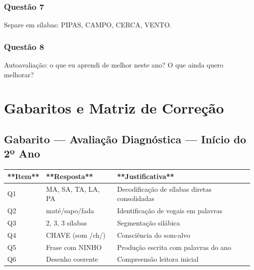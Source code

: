 \subsection*{Questão 7}
Separe em sílabas: PIPAS, CAMPO, CERCA, VENTO.

\begin{center}
  \underline{\hspace{12cm}}
\end{center}

\subsection*{Questão 8}
Autoavaliação: o que eu aprendi de melhor neste ano? O que ainda quero melhorar?

\begin{center}
  \underline{\hspace{12cm}}
\end{center}

\clearpage

\chapter{Gabaritos e Matriz de Correção}

\section{Gabarito --- Avaliação Diagnóstica — Início do 2º Ano}

\begin{center}
\renewcommand{\arraystretch}{1.5}
\begin{tabular}{lll}
\toprule
**Item** & **Resposta** & **Justificativa** \\
\midrule

Q1 & MA, SA, TA, LA, PA & Decodificação de sílabas diretas consolidadas \\

Q2 & maté/sapo/fada & Identificação de vogais em palavras \\

Q3 & 2, 3, 3 sílabas & Segmentação silábica \\

Q4 & CHAVE (som /ch/) & Consciência do som-alvo \\

Q5 & Frase com NINHO & Produção escrita com palavras do ano \\

Q6 & Desenho coerente & Compreensão leitora inicial \\

\bottomrule
\end{tabular}
\end{center}

